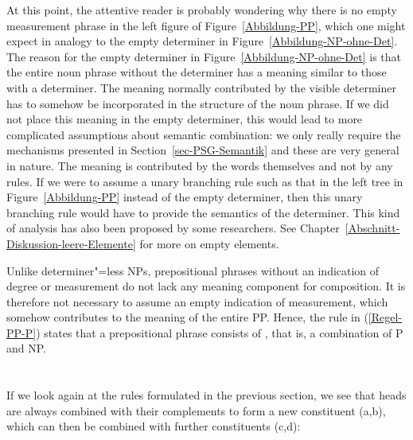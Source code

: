 At this point, the attentive reader is probably wondering why there is no empty measurement phrase in
the left figure of Figure~\ref{Abbildung-PP}, which one might expect in analogy to the empty determiner in Figure~\ref{Abbildung-NP-ohne-Det}.
The reason for the empty determiner in Figure~\ref{Abbildung-NP-ohne-Det} is that the entire noun phrase
without the determiner has a meaning similar to those with a determiner. The meaning normally contributed
by the visible determiner has to somehow be incorporated in the structure of the noun phrase. If we
did not place this meaning in the empty determiner, this would lead to more complicated assumptions about semantic
combination: we only really require the mechanisms presented in Section~\ref{sec-PSG-Semantik} and these are
very general in nature. The meaning is contributed by the words themselves and not by any rules. If we were
to assume a unary branching rule such as that in the left tree in Figure~\ref{Abbildung-PP} instead of the
empty determiner, then this unary branching rule would have to provide the semantics of the determiner. This
kind of analysis has also been proposed by some researchers. See Chapter~\ref{Abschnitt-Diskussion-leere-Elemente} for
more on empty elements.

Unlike determiner"=less NPs, prepositional phrases without an indication of degree or measurement do
not lack any meaning component for composition. It is therefore not necessary to assume an empty indication of measurement, which
somehow contributes to the meaning of the entire PP. Hence, the rule in (\ref{Regel-PP-P}) states that a
prepositional phrase consists of \pbar, that is, a combination of P and NP.

\section{\xbart}
\label{sec-xbar}

\largerpage[2]
If  we look again at the rules formulated in the previous section, we see that heads are always 
combined with their complements to form a new constituent (a,b), which can then be combined with further constituents (c,d):

